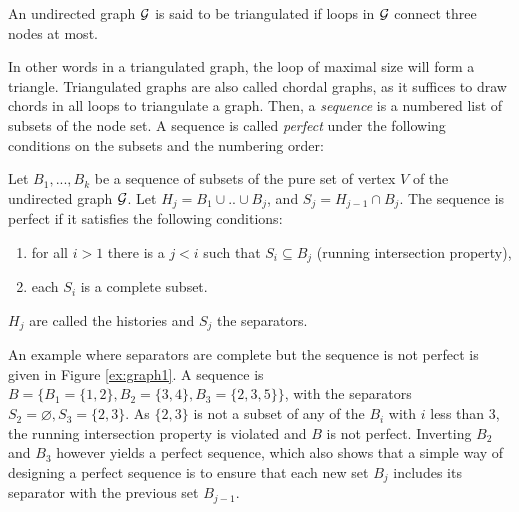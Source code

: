  \begin{definition}
 An undirected graph $\mathcal{G}$ is said to be triangulated if loops in $\mathcal{G}$ connect three nodes at most.
 \end{definition} 
 In other words in a triangulated graph, the loop of maximal size will form a triangle. Triangulated graphs are also called chordal graphs, as it suffices to draw chords in all loops to triangulate a graph. Then, a \textit{sequence} is a numbered list of subsets of the node set. A sequence is called \textit{perfect} under the following conditions on the subsets and the numbering order:
 \begin{definition}\label{def:seq}
 Let $B_1,...,B_k$ be a sequence of subsets of the pure set of vertex $V$ of the undirected graph $\mathcal{G}$. Let $H_j=B_1\cup .. \cup B_j$, and $S_j = H_{j-1} \cap B_j$. The sequence is perfect if it satisfies the following conditions:
 \begin{enumerate}[label=(\roman*)]
 \item for all $i>1$ there is a $j<i$ such that $S_i \subseteq B_j$ (running intersection property),
 \item each $S_i$ is a complete subset.
 \end{enumerate}
 $H_j$ are called the histories and $S_j$ the separators.
 \end{definition}
 An example where separators are complete but the sequence is not perfect is given in Figure \ref{ex:graph1}. A sequence is $B=\big\{B_1=\{1,2\}, B_2=\{3,4\},B_3=\{2,3,5\}\big\}$, with the separators $S_2=\varnothing, S_3=\{2,3\}$. As $\{2,3\}$ is not a subset of any of the $B_i$ with $i$ less than 3, the running intersection property is violated and $B$ is not perfect. Inverting $B_2$ and $B_3$ however yields a perfect sequence, which also shows that a simple way of designing a perfect sequence is to ensure that each new set $B_j$ includes its separator with the previous set $B_{j-1}$. 
